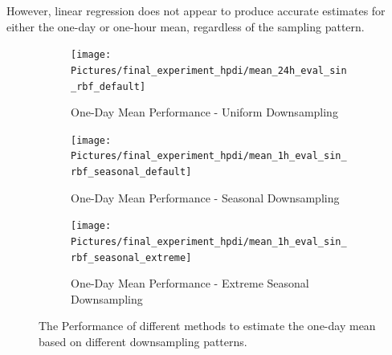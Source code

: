 However, linear regression does not appear to produce accurate estimates for
either the one-day or one-hour mean, regardless of the sampling pattern.


\begin{figure}[!htb]
\centering
\begin{subfigure}{\textwidth}
    \centering
    \texttt{[image: Pictures/final\_experiment\_hpdi/mean\_24h\_eval\_sin\_rbf\_default]}
    \caption{One-Day Mean Performance - Uniform Downsampling}
    \label{fig:daily-mean-uniform-sampling-performance}
\end{subfigure}

\bigskip

\begin{subfigure}{\textwidth}
    \centering
    \texttt{[image: Pictures/final\_experiment\_hpdi/mean\_1h\_eval\_sin\_rbf\_seasonal\_default]}
    \caption{One-Day Mean Performance - Seasonal Downsampling}
    \label{fig:daily-mean-seasonal-sampling-performance}
\end{subfigure}

\bigskip

\begin{subfigure}{\textwidth}
    \centering
    \texttt{[image: Pictures/final\_experiment\_hpdi/mean\_1h\_eval\_sin\_rbf\_seasonal\_extreme]}
    \caption{One-Day Mean Performance - Extreme Seasonal Downsampling}
    \label{fig:daily-mean-extreme-seasonal-sampling-performance}
\end{subfigure}

\caption[One-Day Mean Performance]{The Performance of different methods to
estimate the one-day mean based on different downsampling patterns.
}
\label{fig:daily-mean-performance}
\end{figure}




